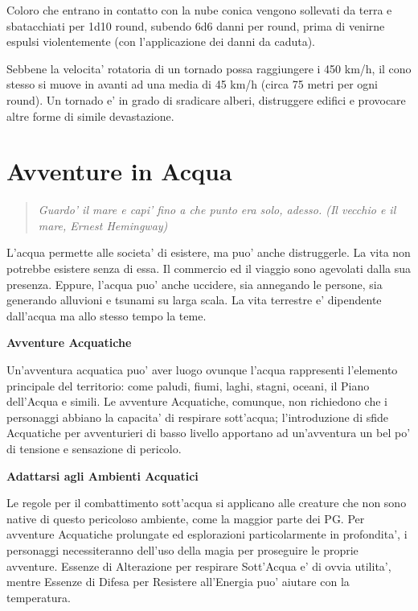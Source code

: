 \documentclass[a4paper,11pt,twoside,openany]{book}
\begin{document}
{Coloro che entrano in contatto con la nube conica vengono sollevati da terra e sbatacchiati per 1d10 round, subendo 6d6 danni per round, prima di venirne espulsi violentemente (con l'applicazione dei danni da caduta).

Sebbene la velocita' rotatoria di un tornado possa raggiungere i 450 km/h, il cono stesso si muove in avanti ad una media di 45 km/h (circa 75 metri per ogni round). Un tornado e' in grado di sradicare alberi, distruggere edifici e provocare altre forme di simile devastazione.

\pagebreak

\section{Avventure in Acqua}

\label{avventure-in-acqua}
\begin{quote}\textit{
Guardo' il mare e capi' fino a che punto era solo, adesso. (Il vecchio e il mare, Ernest Hemingway)
}\end{quote}

L'acqua permette alle societa' di esistere, ma puo' anche distruggerle. La vita non potrebbe esistere senza di essa. Il commercio ed il viaggio sono agevolati dalla sua presenza. Eppure, l'acqua puo' anche uccidere, sia annegando le persone, sia generando alluvioni e tsunami su larga scala. La vita terrestre e' dipendente dall'acqua ma allo stesso tempo la teme.

\textbf{Avventure Acquatiche}

Un'avventura acquatica puo' aver luogo ovunque l'acqua rappresenti l'elemento principale del territorio: come paludi, fiumi, laghi, stagni, oceani, il Piano dell'Acqua e simili. Le avventure Acquatiche, comunque, non richiedono che i personaggi abbiano la capacita' di respirare sott'acqua; l'introduzione di sfide Acquatiche per avventurieri di basso livello apportano ad un'avventura un bel po' di tensione e sensazione di pericolo.

\textbf{Adattarsi agli Ambienti Acquatici}

Le regole per il combattimento sott'acqua si applicano alle creature che non sono native di questo pericoloso ambiente, come la maggior parte dei PG. Per avventure Acquatiche prolungate ed esplorazioni particolarmente in profondita', i personaggi necessiteranno dell'uso della magia per proseguire le proprie avventure. Essenze di Alterazione per respirare Sott'Acqua e' di ovvia utilita', mentre Essenze di Difesa per Resistere all'Energia puo' aiutare con la temperatura.

}
\end{document}

